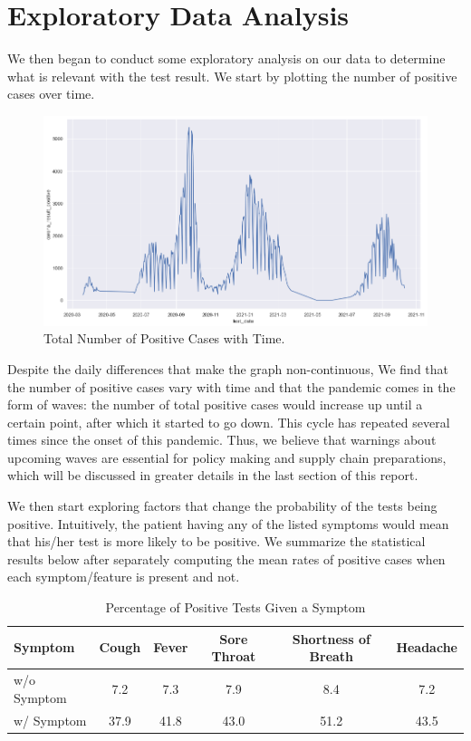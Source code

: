\documentclass[a4paper, 11pt]{article}
\begin{document}
\section*{Exploratory Data Analysis}
We then began to conduct some exploratory analysis on our data to determine what is relevant with the test result.
We start by plotting the number of positive cases over time. \par
\begin{figure}[H]
\centering
\includegraphics[scale=0.4]{total.png}
\caption{Total Number of Positive Cases with Time.}
\label{Confirmed Cases}
\end{figure}
Despite the daily differences that make the graph non-continuous, We find that the number of positive cases vary with time and that the pandemic comes in the form of waves: the number of total positive cases would increase up until a certain point, after which it started to go down. This cycle has repeated several times since the onset of this pandemic. Thus, we believe that warnings about upcoming waves are essential for policy making and supply chain preparations, which will be discussed in greater details in the last section of this report. \par
We then start exploring factors that change the probability of the tests being positive. Intuitively, the patient having any of the listed symptoms would mean that his/her test is more likely to be positive. We summarize the statistical results below after separately computing the mean rates of positive cases when each symptom/feature is present and not.\par
\begin{table}[H]
\centering
\caption{Percentage of Positive Tests Given a Symptom}
\begin{tabular}{| l | c | c | c | c | c |}
\hline
Symptom & Cough & Fever & Sore Throat & Shortness of Breath & Headache  \\ \hline
w/o Symptom & 7.2 & 7.3 & 7.9 & 8.4 & 7.2 \\ \hline
w/ Symptom & 37.9 & 41.8 & 43.0 & 51.2 & 43.5 \\
\hline
\end{tabular}
\label{Table}
\end{table}
\end{document}
